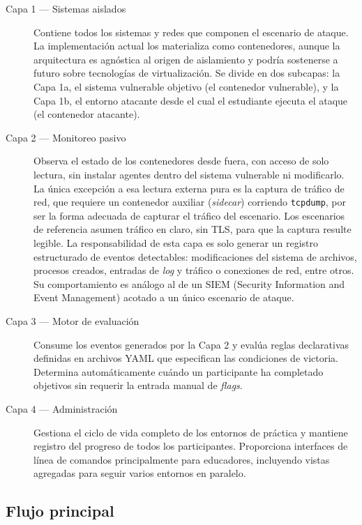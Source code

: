 \begin{description}
    \item[Capa 1 — Sistemas aislados] Contiene todos los sistemas y redes que
    componen el escenario de ataque. La implementación actual los materializa
    como contenedores, aunque la arquitectura es agnóstica al origen de
    aislamiento y podría sostenerse a futuro sobre tecnologías de
    virtualización. Se divide en dos subcapas: la Capa 1a, el sistema vulnerable
    objetivo (el contenedor vulnerable), y la Capa 1b, el entorno atacante desde
    el cual el estudiante ejecuta el ataque (el contenedor atacante).

    \item[Capa 2 — Monitoreo pasivo] Observa el estado de los contenedores
    desde fuera, con acceso de solo lectura, sin instalar agentes dentro
    del sistema vulnerable ni modificarlo. La única excepción a
    esa lectura externa pura es la captura de tráfico de red, que requiere un
    contenedor auxiliar (\textit{sidecar}) corriendo \texttt{tcpdump}, por ser
    la forma adecuada de capturar el tráfico del escenario. Los escenarios de
    referencia asumen tráfico en claro, sin TLS, para que la captura resulte
    legible. La responsabilidad de esta capa es solo generar un registro
    estructurado de eventos detectables: modificaciones del sistema de archivos,
    procesos creados, entradas de \textit{log} y tráfico o conexiones de red,
    entre
    otros. Su comportamiento es análogo al de un SIEM (Security Information and
    Event Management) acotado a un único escenario de ataque.

    \item[Capa 3 — Motor de evaluación] Consume los eventos generados por la
    Capa 2 y evalúa reglas declarativas definidas en archivos YAML que
    especifican las condiciones de victoria. Determina automáticamente cuándo un
    participante ha completado objetivos sin requerir la entrada manual de
    \textit{flags}.

    \item[Capa 4 — Administración] Gestiona el ciclo de vida completo de los
    entornos de práctica y mantiene registro del progreso de todos los
    participantes. Proporciona interfaces de línea de comandos principalmente
    para educadores, incluyendo vistas agregadas para seguir varios entornos
    en paralelo.
\end{description}

\subsection{Flujo principal}

